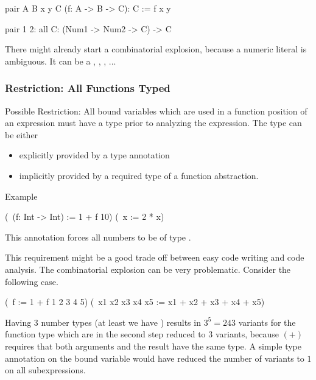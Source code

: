 \begin{alba}
    pair A B x y C (f: A -> B -> C): C :=
        f x y

    pair 1 2: all C: (Num1 -> Num2 -> C) -> C
\end{alba}

There might already start a combinatorial explosion, because a numeric literal
is ambiguous. It can be a , , ,
 ...




\vskip 5mm
\subsubsection{Restriction: All Functions Typed}

Possible Restriction: All bound variables which are used in a function position
of an expression must have a type prior to analyzing the expression. The type
can be either

\begin{itemize}
\item explicitly provided by a type annotation

\item implicitly provided by a required type of a function abstraction.
\end{itemize}

Example

\begin{alba}
    (\ (f: Int -> Int) := 1 + f 10) (\ x := 2 * x)
\end{alba}

This annotation forces all numbers to be of type .

This requirement might be a good trade off between easy code writing and code
analysis. The combinatorial explosion can be very problematic. Consider the
following case.

\begin{alba}
    (\ f := 1 + f 1 2 3 4 5) (\ x1 x2 x3 x4 x5 := x1 + x2 + x3 + x4 + x5)
\end{alba}

Having 3 number types (at least we have ) results in
$3^5 = 243$ variants for the function type which are in the second step reduced
to $3$ variants, because $(+)$ requires that both arguments and the result have
the same type. A simple type annotation on the bound variable  would
have reduced the number of variants to $1$ on all subexpressions.







